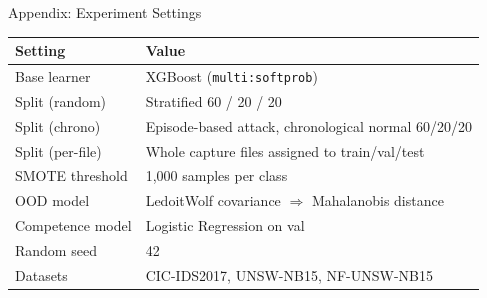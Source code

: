 \documentclass[aspectratio=169,10pt]{beamer}
\begin{document}
\begin{frame}{Appendix: Experiment Settings}
  \footnotesize
  \renewcommand{\arraystretch}{1.25}
  \begin{tabular}{ll}
    \toprule
    \textbf{Setting} & \textbf{Value} \\
    \midrule
    Base learner       & XGBoost (\texttt{multi:softprob}) \\
    Split (random)     & Stratified 60 / 20 / 20 \\
    Split (chrono)     & Episode-based attack, chronological normal 60/20/20 \\
    Split (per-file)   & Whole capture files assigned to train/val/test \\
    SMOTE threshold    & 1{,}000 samples per class \\
    OOD model          & LedoitWolf covariance $\Rightarrow$ Mahalanobis distance \\
    Competence model   & Logistic Regression on val \\
    Random seed        & 42 \\
    Datasets           & CIC-IDS2017, UNSW-NB15, NF-UNSW-NB15 \\
    \bottomrule
  \end{tabular}
\end{frame}
\end{document}

